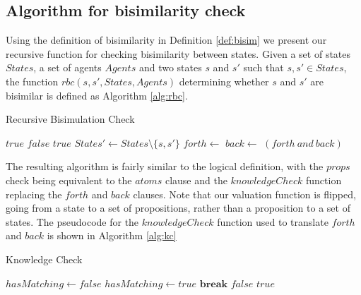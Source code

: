 
\subsection{Algorithm for bisimilarity check}

Using the definition of bisimilarity in Definition \ref{def:bisim} we present our recursive function for checking bisimilarity between states. Given a set of states $States$, a set of agents $Agents$ and two states $s$ and $s'$ such that $s, s' \in States$, the function $rbc(s,s',States, Agents)$ determining whether $s$ and $s'$ are bisimilar is defined as Algorithm \ref{alg:rbc}. 

\begin{algorithm}
\caption{Recursive Bisimulation Check}
\label{alg:rbc}
\begin{algorithmic}[H]
		\State\Return $true$
		\State\Return $false$
		\State\Return $true$
	\Else
		\State $States' \gets States \setminus \{s,s'\}$
		\State $forth \gets$ 
		\State $back \gets$ 
		\State \Return $(forth \ and \ back)$
	\EndIf
\EndFunction
\end{algorithmic}
\end{algorithm}

The resulting algorithm is fairly similar to the logical definition, with the $props$ check being equivalent to the $atoms$ clause and the $knowledgeCheck$ function replacing the $forth$ and $back$ clauses. Note that our valuation function is flipped, going from a state to a set of propositions, rather than a proposition to a set of states. The pseudocode for the $knowledgeCheck$ function used to translate $forth$ and $back$ is shown in Algorithm \ref{alg:kc}

\begin{algorithm}
\caption{Knowledge Check}
\label{alg:kc}
\begin{algorithmic}
			\State $hasMatching \gets false$
					\State $hasMatching \gets true$
					\State $\mathbf{break}$
				\EndIf
			\EndFor
				\State\Return $false$
			\EndIf
		\EndFor	
	\EndFor
	\State \Return $true$ 
\EndFunction
\end{algorithmic}
\end{algorithm}

